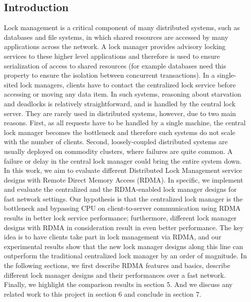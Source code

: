 \documentclass[twoside]{article}
\begin{document}
\begin{multicols}{2} 

\section{Introduction}
\label{Introduction}
Lock management is a critical component of many distributed systems, such as databases and file systems, in which shared resources are accessed by many applications across the network. A lock manager provides advisory locking services to these higher level applications and therefore is used to ensure serialization of access to shared resources (for example databases need this property to ensure the isolation between concurrent transactions).
In a single-sited lock managers, clients have to contact the centralized lock service before accessing or moving any data item. In such systems, reasoning about starvation and deadlocks is relatively straightforward, and is handled by the central lock server. They are rarely used in distributed systems, however, due to two main reasons. First, as all requests have to be handled by a single machine, the central lock manager becomes the bottleneck and therefore such systems do not scale with the number of clients. Second, loosely-coupled distributed systems are usually deployed on commodity clusters, where failures are quite common. A failure or delay in the central lock manager could bring the entire system down.
In this work, we aim to evaluate different Distributed Lock Management service designs with Remote Direct Memory Access (RDMA). In specific, we implement and evaluate the centralized and the RDMA-enabled lock manager designs for fast network settings. Our hypothesis is that the centralized lock manager is the bottleneck and bypassing CPU on client-to-server communication using RDMA results in better lock service performance; furthermore, different lock manager designs with RDMA in consideration result in even better performance.
The key idea is to have clients take part in lock management via RDMA, and our experimental results show that the new lock manager designs along this line can outperform the traditional centralized lock manager by an order of magnitude.
In the following sections, we first describe RDMA features and basics, describe different lock manager designs and their performances over a fast network. Finally, we highlight the comparison results in section 5. And we discuss any related work to this project in section 6 and conclude in section 7.





\end{multicols}
\end{document}

